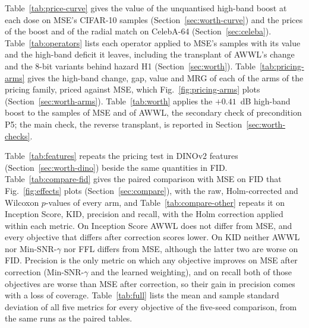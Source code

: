 Table~\ref{tab:price-curve} gives the value of the unquantised high-band
boost at each dose on MSE's CIFAR-10 samples (Section~\ref{sec:worth-curve})
and the prices of the boost and of the radial match on CelebA-64
(Section~\ref{sec:celeba}). Table~\ref{tab:operators} lists each operator
applied to MSE's samples with its value and the high-band deficit it leaves,
including the transplant of AWWL's change and the 8-bit variants behind
hazard H1 (Section~\ref{sec:worth}). Table~\ref{tab:pricing-arms} gives the
high-band change, gap, value and MRG of each of the \nFamilyPricing{} arms of
the pricing family, priced against MSE, which Fig.~\ref{fig:pricing-arms}
plots (Section~\ref{sec:worth-arms}). Table~\ref{tab:worth} applies the
$+0.41$~dB high-band boost to the samples of MSE and of AWWL, the secondary
check of precondition P5; the main check, the reverse transplant, is
reported in Section~\ref{sec:worth-checks}.

Table~\ref{tab:features} repeats the pricing test in DINOv2 features
(Section~\ref{sec:worth-dino}) beside the same quantities in FID.
Table~\ref{tab:compare-fid} gives the paired comparison with MSE on FID that
Fig.~\ref{fig:effects} plots (Section~\ref{sec:compare}), with the raw,
Holm-corrected and Wilcoxon $p$-values of every arm, and
Table~\ref{tab:compare-other} repeats it on Inception Score, KID, precision
and recall, with the Holm correction applied within each metric.
On Inception Score AWWL does not differ from MSE, and every objective that
differs after correction scores lower. On KID neither AWWL nor
Min-SNR-$\gamma$ nor FFL differs from MSE, although the latter two are worse
on FID. Precision is the only metric on which any objective improves on MSE
after correction (Min-SNR-$\gamma$ and the learned weighting), and on recall
both of those objectives are worse than MSE after correction, so their gain
in precision comes with a loss of coverage. Table~\ref{tab:full} lists the
mean and sample standard deviation of all five metrics for every objective of
the five-seed comparison, from the same runs as the paired tables.

